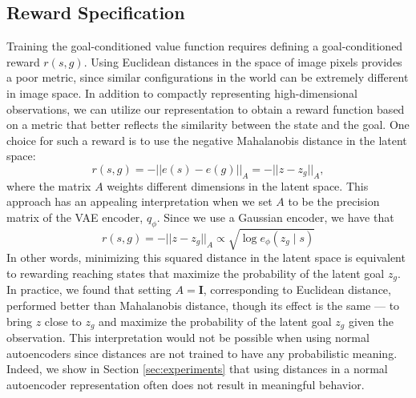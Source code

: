 \subsection{Reward Specification}\label{sec:reward-specification}
Training the goal-conditioned value function requires defining a goal-conditioned reward $r(s,g)$.
Using Euclidean distances in the space of image pixels provides a poor metric, since similar configurations in the world can be extremely different in image space.
In addition to compactly representing high-dimensional observations, we can utilize our representation to obtain a reward function based on a metric that better reflects the similarity between the state and the goal.
One choice for such a reward is to use the negative Mahalanobis distance in the latent space:
\begin{equation}\nonumber
    r(s, g) = -||e(s) - e(g)||_A = - ||z - z_g||_A,
\end{equation}
where the matrix $A$ weights different dimensions in the latent space.
This approach has an appealing interpretation when we set $A$ to be the precision matrix of the VAE encoder, $q_\phi$.
Since we use a Gaussian encoder, we have that
\begin{equation}\label{eq:reward-log-prob-equivalence}
    r(s, g) = - ||z - z_g||_A \propto \sqrt{\log e_\phi(z_g \mid s)}
\end{equation}
In other words, minimizing this squared distance in the latent space is equivalent to rewarding reaching states that maximize the probability of the latent goal $z_g$.
In practice, we found that setting $A = \mathbf{I}$, corresponding to Euclidean distance, performed better than Mahalanobis distance, though its effect is the same --- to bring $z$ close to $z_g$ and maximize the probability of the latent goal $z_g$ given the observation.
This interpretation would not be possible when using normal autoencoders since distances are not trained to have any probabilistic meaning.
Indeed, we show in Section \ref{sec:experiments} that using distances in a normal autoencoder representation often does not result in meaningful behavior.

